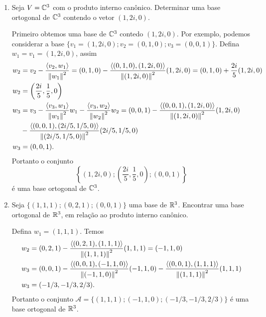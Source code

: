 \begin{exemplo}
	\begin{enumerate}[label={\arabic*})]
		\item Seja $V = \mathbb{C}^3$ com o produto interno can\^onico. Determinar uma base ortogonal de $\mathbb{C}^3$ contendo o vetor $(1, 2i, 0)$.
		\begin{solucao}
			Primeiro obtemos uma base de $\mathbb{C}^3$ contedo $(1, 2i, 0)$. Por exemplo, podemos considerar a base $\{v_1 = (1, 2i, 0); v_2 = (0, 1, 0); v_3 = (0, 0, 1)\}$. Defina $w_1 = v_1 = (1, 2i, 0)$, assim
			\begin{align*}
				w_2 &= v_2 - \dfrac{\langle v_2, w_1\rangle}{\left\lVert w_1\right\rVert^2} = (0, 1, 0) - \dfrac{\langle (0, 1, 0), (1, 2i, 0)\rangle}{\left\lVert(1, 2i, 0)\right\rVert^2}(1, 2i, 0) = (0, 1, 0) + \dfrac{2i}{5}(1, 2i, 0)\\ w_2 &= \left(\dfrac{2i}{5}, \dfrac{1}{5}, 0\right)\\
				w_3 &= v_3 - \dfrac{\langle v_3, w_1\rangle}{\left\lVert w_1\right\rVert^2}w_1 - \dfrac{\langle v_3, w_2\rangle}{\left\lVert w_2\right\rVert^2}w_2 = (0, 0, 1) - \dfrac{\langle (0, 0, 1), (1, 2i, 0)\rangle}{\left\lVert(1, 2i, 0)\right\rVert^2}(1, 2i, 0) \\ &- \dfrac{\langle (0, 0, 1), (2i/5, 1/5, 0)\rangle}{\left\lVert(2i/5, 1/5, 0)\right\rVert^2}(2i/5, 1/5, 0) \\ w_3 &= (0, 0, 1).
			\end{align*}
			Portanto o conjunto
			\[
				\left\{(1, 2i, 0); \left(\dfrac{2i}{5}, \dfrac{1}{5},0\right); (0, 0, 1)\right\}
			\]
			\'e uma base ortogonal de $\mathbb{C}^3$.
		\end{solucao}
		\item Seja $\{(1, 1, 1); (0, 2, 1); (0, 0, 1)\}$ uma base de $\mathbb{R}^3$. Encontrar uma base ortogonal de $\mathbb{R}^3$, em rela\c{c}\~ao ao produto interno can\^onico.
		\begin{solucao}
			Defina $w_1 = (1, 1, 1)$. Temos
			\begin{align*}
				w_2 &= (0, 2, 1) - \dfrac{\langle (0, 2, 1) , (1, 1, 1)\rangle}{\left\lVert(1, 1, 1)\right\rVert^2}(1, 1, 1) = (-1, 1, 0)\\
				w_3 &= (0, 0 ,1) - \dfrac{\langle (0, 0, 1), (-1, 1, 0)\rangle}{\left\lVert(-1, 1, 0)\right\rVert^2}(-1, 1, 0) - \dfrac{\langle (0, 0, 1), (1, 1, 1)\rangle}{\left\lVert(1, 1, 1)\right\rVert^2}(1, 1, 1)\\ w_3 &= (-1/3, -1/3, 2/3).
			\end{align*}
			Portanto o conjunto $\mathcal{A} = \{(1, 1, 1); (-1, 1, 0); (-1/3, -1/3, 2/3)\}$ \'e uma base ortogonal de $\mathbb{R}^3$.
		\end{solucao}
	\end{enumerate}
\end{exemplo}

